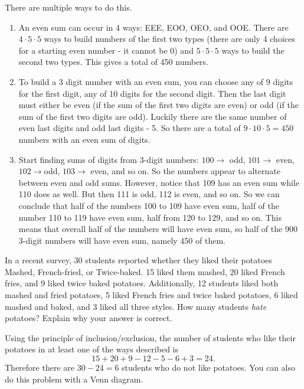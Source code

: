 \begin{questions}
\begin{solution}
  There are multiple ways to do this.
  \begin{enumerate}
    \item An even sum can occur in 4 ways: EEE, EOO, OEO, and OOE.  There are $4 \cdot 5 \cdot 5$ ways to build numbers of the first two types (there are only 4 choices for a starting even number - it cannot be 0) and $5 \cdot 5 \cdot 5$ ways to build the second two types.  This gives a total of 450 numbers.
    \item To build a 3 digit number with an even sum, you can choose any of 9 digits for the first digit, any of 10 digits for the second digit.  Then the last digit must either be even (if the sum of the first two digits are even) or odd (if the sum of the first two digits are odd).  Luckily there are the same number of even last digits and odd last digits - 5.  So there are a total of $9 \cdot 10 \cdot 5 = 450$ numbers with an even sum of digits.
    \item Start finding sums of digits from 3-digit numbers: $100 \to$ odd, $101 \to$ even, $102 \to $odd, $103 \to $ even, and so on.  So the numbers appear to alternate between even and odd sums.  However, notice that 109 has an even sum while 110 does as well.  But then 111 is odd, 112 is even, and so on.  So we can conclude that half of the numbers 100 to 109 have even sum, half of the number 110 to 119 have even sum, half from 120 to 129, and so on.  This means that overall half of the numbers will have even sum, so half of the 900 3-digit numbers will have even sum, namely 450 of them.
  \end{enumerate}
\end{solution}


\question In a recent survey, 30 students reported whether they liked their potatoes Mashed, French-fried, or Twice-baked. 15 liked them mashed, 20 liked French fries, and 9 liked twice baked potatoes. Additionally, 12 students liked both mashed and fried potatoes, 5 liked French fries and twice baked potatoes, 6 liked mashed and baked, and 3 liked all three styles. How many students
{\em hate} potatoes?  Explain why your answer is correct.

	\begin{solution}
	  Using the principle of inclusion/exclusion, the number of students who like their potatoes in at least one of the ways described is \[15 + 20 + 9 - 12 - 5 - 6 + 3 = 24.\]  Therefore there are $30-24 = 6$ students who do not like potatoes.  You can also do this problem with a Venn diagram.
	\end{solution}




\end{questions}
